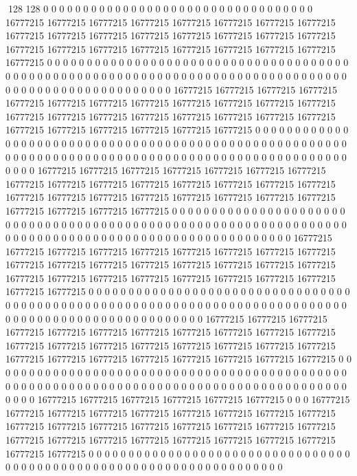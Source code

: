 128 128
0 0 0 0 0 0 0 0 0 0 0 0 0 0 0 0 0 0 0 0 0 0 0 0 0 0 0 0 0 0 0 0 0 0 16777215 16777215 16777215 16777215 16777215 16777215 16777215 16777215 16777215 16777215 16777215 16777215 16777215 16777215 16777215 16777215 16777215 16777215 16777215 16777215 16777215 16777215 16777215 16777215 16777215 0 0 0 0 0 0 0 0 0 0 0 0 0 0 0 0 0 0 0 0 0 0 0 0 0 0 0 0 0 0 0 0 0 0 0 0 0 0 0 0 0 0 0 0 0 0 0 0 0 0 0 0 0 0 0 0 0 0 0 0 0 0 0 0 0 0 0 0 0
0 0 0 0 0 0 0 0 0 0 0 0 0 0 0 0 0 0 0 0 0 0 0 0 0 0 0 0 0 0 0 0 0 16777215 16777215 16777215 16777215 16777215 16777215 16777215 16777215 16777215 16777215 16777215 16777215 16777215 16777215 16777215 16777215 16777215 16777215 16777215 16777215 16777215 16777215 16777215 16777215 16777215 16777215 0 0 0 0 0 0 0 0 0 0 0 0 0 0 0 0 0 0 0 0 0 0 0 0 0 0 0 0 0 0 0 0 0 0 0 0 0 0 0 0 0 0 0 0 0 0 0 0 0 0 0 0 0 0 0 0 0 0 0 0 0 0 0 0 0 0 0 0 0
0 0 0 0 0 0 0 0 0 0 0 0 0 0 0 0 0 0 0 0 0 0 0 0 0 0 0 0 0 0 0 0 0 16777215 16777215 16777215 16777215 16777215 16777215 16777215 16777215 16777215 16777215 16777215 16777215 16777215 16777215 16777215 16777215 16777215 16777215 16777215 16777215 16777215 16777215 16777215 16777215 16777215 16777215 16777215 0 0 0 0 0 0 0 0 0 0 0 0 0 0 0 0 0 0 0 0 0 0 0 0 0 0 0 0 0 0 0 0 0 0 0 0 0 0 0 0 0 0 0 0 0 0 0 0 0 0 0 0 0 0 0 0 0 0 0 0 0 0 0 0 0 0 0 0
0 0 0 0 0 0 0 0 0 0 0 0 0 0 0 0 0 0 0 0 0 0 0 0 0 0 0 0 0 0 0 0 0 16777215 16777215 16777215 16777215 16777215 16777215 16777215 16777215 16777215 16777215 16777215 16777215 16777215 16777215 16777215 16777215 16777215 16777215 16777215 16777215 16777215 16777215 16777215 16777215 16777215 16777215 16777215 0 0 0 0 0 0 0 0 0 0 0 0 0 0 0 0 0 0 0 0 0 0 0 0 0 0 0 0 0 0 0 0 0 0 0 0 0 0 0 0 0 0 0 0 0 0 0 0 0 0 0 0 0 0 0 0 0 0 0 0 0 0 0 0 0 0 0 0
0 0 0 0 0 0 0 0 0 0 0 0 0 0 0 0 0 0 0 0 0 0 0 0 0 0 0 0 0 0 0 0 0 16777215 16777215 16777215 16777215 16777215 16777215 16777215 16777215 16777215 16777215 16777215 16777215 16777215 16777215 16777215 16777215 16777215 16777215 16777215 16777215 16777215 16777215 16777215 16777215 16777215 16777215 16777215 0 0 0 0 0 0 0 0 0 0 0 0 0 0 0 0 0 0 0 0 0 0 0 0 0 0 0 0 0 0 0 0 0 0 0 0 0 0 0 0 0 0 0 0 0 0 0 0 0 0 0 0 0 0 0 0 0 0 0 0 0 0 0 0 0 0 0 0
0 0 0 0 0 0 0 0 0 0 0 0 0 0 0 0 0 0 0 0 0 0 0 0 16777215 16777215 16777215 16777215 16777215 16777215 0 0 0 16777215 16777215 16777215 16777215 16777215 16777215 16777215 16777215 16777215 16777215 16777215 16777215 16777215 16777215 16777215 16777215 16777215 16777215 16777215 16777215 16777215 16777215 16777215 16777215 16777215 16777215 16777215 0 0 0 0 0 0 0 0 0 0 0 0 0 0 0 0 0 0 0 0 0 0 0 0 0 0 0 0 0 0 0 0 0 0 0 0 0 0 0 0 0 0 0 0 0 0 0 0 0 0 0 0 0 0 0 0 0 0 0 0 0 0 0 0 0 0 0 0
